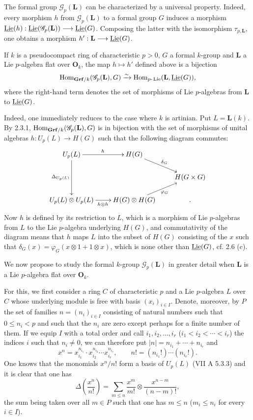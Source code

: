 The formal group $\mathscr G_p(\mathbf L)$ can be characterized by a universal property. Indeed, every morphism $h$ from $\mathscr G_p(\mathbf L)$ to a formal group $G$ induces a morphism $\underline{\operatorname{Lie}}(h):\underline{\operatorname{Lie}}(\mathscr G_p(\mathbf L))\longrightarrow\underline{\operatorname{Lie}}(G)$. Composing the latter with the isomorphism $\tau_{p,\mathbf L}$, one obtains a morphism $h':\mathbf L\longrightarrow\underline{\operatorname{Lie}}(G)$.
\begin{proposition}{}
If $k$ is a pseudocompact ring of characteristic $p>0$, $G$ a formal $k$-group and $\mathbf L$ a Lie $p$-algebra flat over $\mathbf O_k$, the map $h\mapsto h'$ defined above is a bijection
\[
\operatorname{Hom}_{\mathbf{Grf}/k}(\mathscr G_p(\mathbf L),G)\xrightarrow{\sim}\operatorname{Hom}_{p\text{-}\operatorname{Lie}}(\mathbf L,\underline{\operatorname{Lie}}(G)),
\]
where the right-hand term denotes the set of morphisms of Lie $p$-algebras from $\mathbf L$ to $\underline{\operatorname{Lie}}(G)$.
\end{proposition}
Indeed, one immediately reduces to the case where $k$ is artinian. Put $L=\mathbf L(k)$. By 2.3.1, $\operatorname{Hom}_{\mathbf{Grf}/k}(\mathscr G_p(\mathbf L),G)$ is in bijection with the set of morphisms of unital algebras $h:U_p(L)\to H(G)$ such that the following diagram commutes:
\[
\xymatrix@C=22pt@R=17pt{
U_p(L)\ar[r]^h\ar[dd]_{\Delta_{U_p(L)}}&H(G)\ar[dr]^{\delta_G}&\\
&&H(G\times G)\\
U_p(L)\otimes U_p(L)\ar[r]_{h\otimes h}&H(G)\otimes H(G)\ar[ur]_{\varphi_G}&.}
\]
Now $h$ is defined by its restriction to $L$, which is a morphism of Lie $p$-algebras from $L$ to the Lie $p$-algebra underlying $H(G)$, and commutativity of the diagram means that $h$ maps $L$ into the subset of $H(G)$ consisting of the $x$ such that $\delta_G(x)=\varphi_G(x\otimes1+1\otimes x)$, which is none other than $\underline{\operatorname{Lie}}(G)$, cf. 2.6 (c).

We now propose to study the formal $k$-group $\mathscr G_p(\mathbf L)$ in greater detail when $\mathbf L$ is a Lie $p$-algebra flat over $\mathbf O_k$.

For this, we first consider a ring $C$ of characteristic $p$ and a Lie $p$-algebra $L$ over $C$ whose underlying module is free with basis $(x_i)_{i\in I}$. Denote, moreover, by $P$ the set of families $n=(n_i)_{i\in I}$ consisting of natural numbers such that $0\le n_i<p$ and such that the $n_i$ are zero except perhaps for a finite number of them. If we equip $I$ with a total order and call $i_1,i_2,\ldots,i_r$ ($i_1<i_2<\cdots<i_r$) the indices $i$ such that $n_i\ne0$, we can therefore put $|n|=n_{i_1}+\cdots+n_{i_r}$ and
\[
x^n=x_{i_1}^{n_{i_1}}\cdot x_{i_2}^{n_{i_2}}\cdots x_{i_r}^{n_{i_r}},\qquad n!=(n_{i_1}!)\cdots(n_{i_r}!).
\]
One knows that the monomials $x^n/n!$ form a basis of $U_p(L)$ (VII A 5.3.3) and it is clear that one has
\[
\Delta\left(\frac{x^n}{n!}\right)=\sum_{m\le n}\frac{x^m}{m!}\otimes\frac{x^{n-m}}{(n-m)!},\tag{*}
\]
the sum being taken over all $m\in P$ such that one has $m\le n$ (\ie $m_i\le n_i$ for every $i\in I$).
